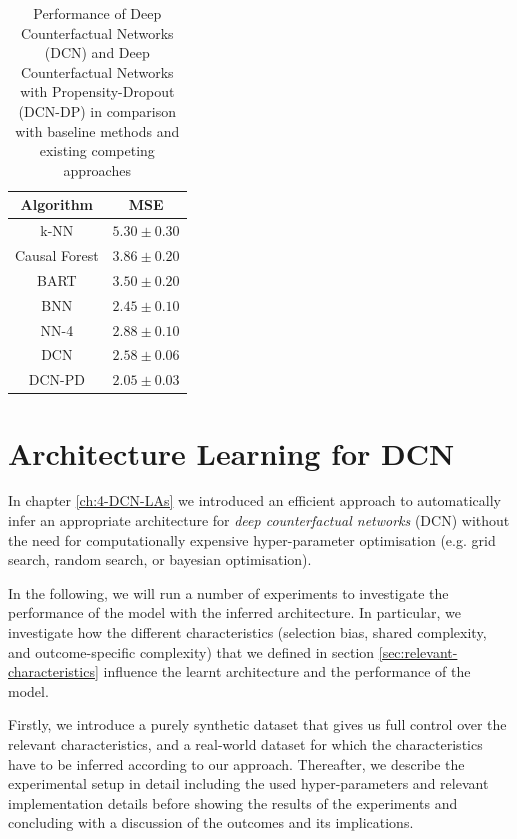 
\begin{table}[]
	\centering
	\begin{tabular}{@{}cc@{}}
		\toprule
		\textbf{Algorithm} & \textbf{MSE}                \\ \midrule
		k-NN               &   $5.30 \pm 0.30$           \\
		Causal Forest      &   $3.86 \pm 0.20$           \\
		BART               &   $3.50 \pm 0.20$           \\ 
		BNN                &   $2.45 \pm 0.10$           \\
		NN-4                &  $2.88 \pm 0.10$           \\
		DCN                &   $2.58 \pm 0.06$           \\
		DCN-PD             &   $2.05 \pm 0.03$          \\\bottomrule
	\end{tabular}
	\caption{Performance of Deep Counterfactual Networks (DCN) and Deep Counterfactual Networks with Propensity-Dropout (DCN-DP) in comparison with baseline methods and existing competing approaches}\label{tab:dcn-pd-results}
\end{table}


\section{Architecture Learning for DCN}
In chapter \ref{ch:4-DCN-LAs} we introduced an efficient approach to automatically infer an appropriate architecture for \emph{deep counterfactual networks} (DCN) without the need for computationally expensive hyper-parameter optimisation (e.g. grid search, random search, or bayesian optimisation). 

In the following, we will run a number of experiments to investigate the performance of the model with the inferred architecture. In particular, we investigate how the different characteristics (selection bias, shared complexity, and outcome-specific complexity) that we defined in section \ref{sec:relevant-characteristics} influence the learnt architecture and the performance of the model. 

Firstly, we introduce a purely synthetic dataset that gives us full control over the relevant characteristics, and a real-world dataset for which the characteristics have to be inferred according to our approach. Thereafter, we describe the experimental setup in detail including the used hyper-parameters and relevant implementation details before showing the results of the experiments and concluding with a discussion of the outcomes and its implications.  


